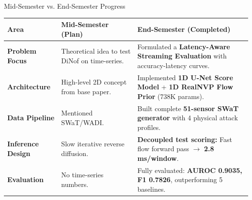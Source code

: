 \documentclass[aspectratio=169, 11pt]{beamer}
\begin{document}
\begin{frame}{Mid-Semester vs. End-Semester Progress}

  \vspace{-2pt}
  \begin{table}[h]
  \centering
  \small
  \begin{tabular}{p{} p{} p{}}
  \toprule
  \textbf{Area} & \textbf{Mid-Semester (Plan)} & \textbf{End-Semester (Completed)} \\
  \midrule
  \textbf{Problem Focus} & Theoretical idea to test DiNof on time-series. & Formulated a \textbf{Latency-Aware Streaming Evaluation} with accuracy-latency curves. \\
  \addlinespace[4pt]
  \textbf{Architecture} & High-level 2D concept from base paper. & Implemented \textbf{1D U-Net Score Model} + \textbf{1D RealNVP Flow Prior} (738K params). \\
  \addlinespace[4pt]
  \textbf{Data Pipeline} & Mentioned SWaT/WADI. & Built complete \textbf{51-sensor SWaT generator} with 4 physical attack profiles. \\
  \addlinespace[4pt]
  \textbf{Inference Design} & Slow iterative reverse diffusion. & \textbf{Decoupled test scoring:} Fast flow forward pass $\to$ \textbf{2.8\,ms/window}. \\
  \addlinespace[4pt]
  \textbf{Evaluation} & No time-series numbers. & Fully evaluated: \textbf{AUROC 0.9035, F1 0.7826}, outperforming 5 baselines. \\
  \bottomrule
  \end{tabular}
  \end{table}

\end{frame}
\end{document}
